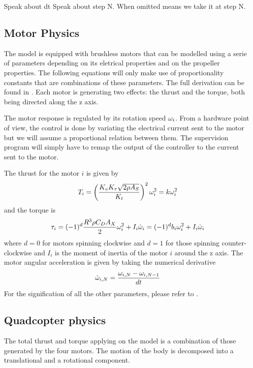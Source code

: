 Speak about dt
Speak about step N. When omitted means we take it at step N.

\subsection{Motor Physics}
The model is equipped with brushless motors that can be modelled using a serie
of parameters depending on its eletrical properties and on the propeller
properties. The following equations will only make use of proportionality
constants that are combinations of these parameters. The full derivation can be
found in .
Each motor is generating two effects: the thrust and the torque, both being directed along the z axis.
	
The motor response is regulated by its rotation speed $\omega_i$. From a hardware
point of view, the control is done by variating the electrical current sent to
the motor but we will assume a proportional relation between them. The
supervision program will simply have to remap the output of the controller to
the current sent to the motor.

The thrust for the motor $i$ is given by
\begin{equation}\labeleq{motorThrust}
	T_i = \left(\frac{K_vK_\tau\sqrt{2\rho A_S}}{K_t}\right)^2\om^2
	= k\om^2
\end{equation}
and the torque is
\begin{equation}\labeleq{motorTau}
	\tau_i = (-1)^{d}\frac{R^3\rho C_D A_X}{2}\om^2 + I_i\omd = (-1)^{d}b_i\om^2
	+ I_i\omd
\end{equation}
where $d=0$ for motors spinning clockwise and $d=1$ for those spinning
counter-clockwise and $I_i$ is the moment of inertia of the motor $i$ around the z
axis. The motor angular acceleration is given by taking the numerical derivative
\begin{equation}
	\dot{\omega}_{i,N} = \frac{\omega_{i,N}-\omega_{i,N-1}}{dt}
\end{equation} 
For the signification of all the other parameters, please refer to .

\subsection{Quadcopter physics}
The total thrust and torque applying on the model is a combination of those
generated by the four motors. The motion of the body is decomposed into a
translational and a rotational component.

